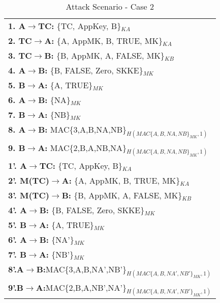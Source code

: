 \begin{table}\caption{Attack Scenario - Case 2}
\label{tab:att2}
\centering
\begin{tabular}{l}
\hline
\textbf{1. A\(\rightarrow\)TC:} \{TC, AppKey, B\}$_{KA}$   \\
\textbf{2. TC\(\rightarrow\)A:} \{A, AppMK, B, TRUE, MK\}$_{KA}$ \\
\textbf{3. TC\(\rightarrow\)B:} \{B, AppMK, A, FALSE, MK\}$_{KB}$ \\
\textbf{4. A\(\rightarrow\)B:} \{B, FALSE, Zero, SKKE\}$_{MK}$ \\
\textbf{5. B\(\rightarrow\)A:} \{A, TRUE\}$_{MK}$                 \\                           
\textbf{6. A\(\rightarrow\)B:} \{NA\}$_{MK}$      \\                
\textbf{7. B\(\rightarrow\)A:} \{NB\}$_{MK}$                  \\                       
\textbf{8. A\(\rightarrow\)B:} MAC\{3,A,B,NA,NB\}$_{H(MAC\{A,B,NA,NB\}_{MK},1)}$        \\
\textbf{9. B\(\rightarrow\)A:} MAC\{2,B,A,NB,NA\}$_{H(MAC\{A,B,NA,NB\}_{MK},1)}$        \\
\hline
\textbf{1'. A\(\rightarrow\)TC:} \{TC, AppKey, B\}$_{KA}$   \\
\textbf{2'. M(TC)\(\rightarrow\)A:} \{A, AppMK, B, TRUE, MK\}$_{KA}$ \\
\textbf{3'. M(TC)\(\rightarrow\)B:} \{B, AppMK, A, FALSE, MK\}$_{KB}$ \\
\textbf{4'. A\(\rightarrow\)B:} \{B, FALSE, Zero, SKKE\}$_{MK}$ \\
\textbf{5'. B\(\rightarrow\)A:} \{A, TRUE\}$_{MK}$                 \\                           
\textbf{6'. A\(\rightarrow\)B:} \{NA'\}$_{MK}$      \\                
\textbf{7'. B\(\rightarrow\)A:} \{NB'\}$_{MK}$                  \\                       
\textbf{8'.\hspace{0.02cm}A\(\rightarrow\)B:}\hspace{0.02cm}MAC\{3,A,B,NA',NB'\}$_{H(MAC\{A,B,NA',NB'\}_{MK},1)}$        \\
\textbf{9'.\hspace{0.02cm}B\(\rightarrow\)A:}\hspace{0.02cm}MAC\{2,B,A,NB',NA'\}$_{H(MAC\{A,B,NA',NB'\}_{MK},1)}$        \\
\hline
\end{tabular}
\end{table}

